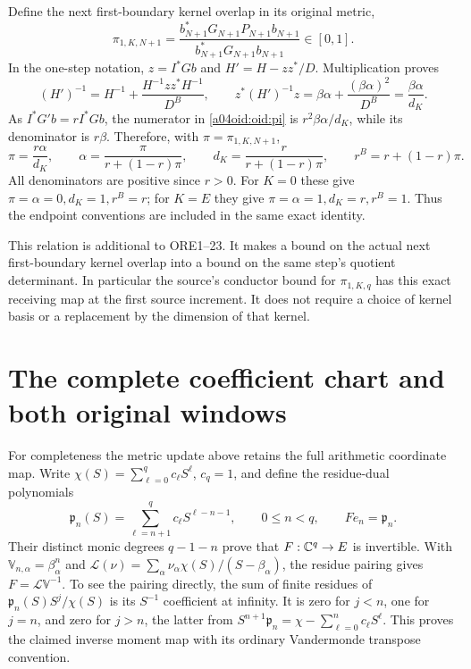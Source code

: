 Define the next first-boundary kernel overlap in its original metric,
\begin{equation}\label{a04oid:oid:pi}
 \pi_{1,K,N+1}
 =\frac{b_{N+1}^*G_{N+1}P_{N+1}b_{N+1}}
 {b_{N+1}^*G_{N+1}b_{N+1}}\in[0,1].
\end{equation}
In the one-step notation, $z=I^*Gb$ and
$H'=H-zz^*/D$. Multiplication proves
\[
 (H')^{-1}=H^{-1}
 +\frac{H^{-1}zz^*H^{-1}}{D^B},\qquad
 z^*(H')^{-1}z
 =\beta\alpha+\frac{(\beta\alpha)^2}{D^B}
 =\frac{\beta\alpha}{d_K}.
\]
As $I^*G'b=rI^*Gb$, the numerator in \eqref{a04oid:oid:pi} is
$r^2\beta\alpha/d_K$, while its denominator is $r\beta$.
Therefore, with $\pi=\pi_{1,K,N+1}$,
\begin{equation}\label{a04oid:oid:newallocation}
 \boxed{\pi=\frac{r\alpha}{d_K},\qquad
 \alpha=\frac{\pi}{r+(1-r)\pi},\qquad
 d_K=\frac r{r+(1-r)\pi},\qquad
 r^B=r+(1-r)\pi.}
\end{equation}
All denominators are positive since $r>0$. For $K=0$ these give
$\pi=\alpha=0,d_K=1,r^B=r$; for $K=E$ they give
$\pi=\alpha=1,d_K=r,r^B=1$. Thus the endpoint conventions are
included in the same exact identity.

This relation is additional to ORE1--23. It makes a bound on the
actual next first-boundary kernel overlap into a bound on the same
step's quotient determinant. In particular the source's conductor
bound for $\pi_{1,K,q}$ has this exact receiving map at the first
source increment. It does not require a choice of kernel basis or a
replacement by the dimension of that kernel.

\section{The complete coefficient chart and both original windows}

For completeness the metric update above retains the full arithmetic
coordinate map. Write $\chi(S)=\sum_{\ell=0}^qc_\ell S^\ell$,
$c_q=1$, and define the residue-dual polynomials
\[
 \mathfrak p_n(S)=\sum_{\ell=n+1}^qc_\ell S^{\ell-n-1},
 \qquad 0\le n<q,
 \qquad F e_n=\mathfrak p_n.
\]
Their distinct monic degrees $q-1-n$ prove that $F:\mathbb C^q\to E$
is invertible. With $\mathbb V_{n,\alpha}=\beta_\alpha^n$ and
$\mathcal L(\nu)=\sum_\alpha\nu_\alpha\chi(S)/(S-\beta_\alpha)$,
the residue pairing gives $F=\mathcal L\mathbb V^{-1}$. To see the
pairing directly, the sum of finite residues of
$\mathfrak p_n(S)S^j/\chi(S)$ is its $S^{-1}$ coefficient at infinity.
It is zero for $j<n$, one for $j=n$, and zero for $j>n$, the latter
from
$S^{n+1}\mathfrak p_n=\chi-\sum_{\ell=0}^nc_\ell S^\ell$.
This proves the claimed inverse moment map with its ordinary
Vandermonde transpose convention.

